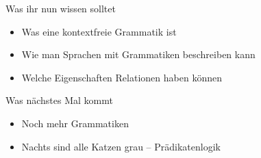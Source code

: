 \begin{frame}
	\begin{block}{Was ihr nun wissen solltet}
		\begin{itemize}
			\item Was eine kontextfreie Grammatik ist
			\item Wie man Sprachen mit Grammatiken beschreiben kann
			\item Welche Eigenschaften Relationen haben können
		\end{itemize}
	\end{block}
	
	\begin{block}{Was nächstes Mal kommt}
		\begin{itemize}
			\item Noch mehr Grammatiken
			\item Nachts sind alle Katzen grau -- Prädikatenlogik
		\end{itemize}
	\end{block}
\end{frame}	







\backupend
